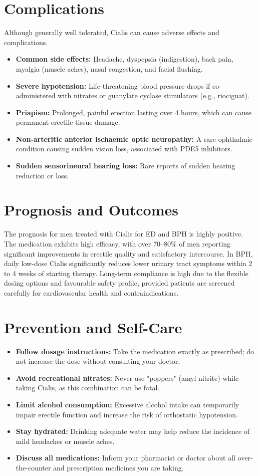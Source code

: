 \section*{Complications}
Although generally well tolerated, Cialis can cause adverse effects and complications.
\begin{itemize}
    \item \textbf{Common side effects:} Headache, dyspepsia (indigestion), back pain, myalgia (muscle aches), nasal congestion, and facial flushing.
    \item \textbf{Severe hypotension:} Life-threatening blood pressure drops if co-administered with nitrates or guanylate cyclase stimulators (e.g., riociguat).
    \item \textbf{Priapism:} Prolonged, painful erection lasting over 4 hours, which can cause permanent erectile tissue damage.
    \item \textbf{Non-arteritic anterior ischaemic optic neuropathy:} A rare ophthalmic condition causing sudden vision loss, associated with PDE5 inhibitors.
    \item \textbf{Sudden sensorineural hearing loss:} Rare reports of sudden hearing reduction or loss.
\end{itemize}

\section*{Prognosis and Outcomes}
The prognosis for men treated with Cialis for ED and BPH is highly positive. The medication exhibits high efficacy, with over 70--80\% of men reporting significant improvements in erectile quality and satisfactory intercourse. In BPH, daily low-dose Cialis significantly reduces lower urinary tract symptoms within 2 to 4 weeks of starting therapy. Long-term compliance is high due to the flexible dosing options and favourable safety profile, provided patients are screened carefully for cardiovascular health and contraindications.

\section*{Prevention and Self-Care}
\begin{itemize}
    \item \textbf{Follow dosage instructions:} Take the medication exactly as prescribed; do not increase the dose without consulting your doctor.
    \item \textbf{Avoid recreational nitrates:} Never use "poppers" (amyl nitrite) while taking Cialis, as this combination can be fatal.
    \item \textbf{Limit alcohol consumption:} Excessive alcohol intake can temporarily impair erectile function and increase the risk of orthostatic hypotension.
    \item \textbf{Stay hydrated:} Drinking adequate water may help reduce the incidence of mild headaches or muscle aches.
    \item \textbf{Discuss all medications:} Inform your pharmacist or doctor about all over-the-counter and prescription medicines you are taking.
\end{itemize}

